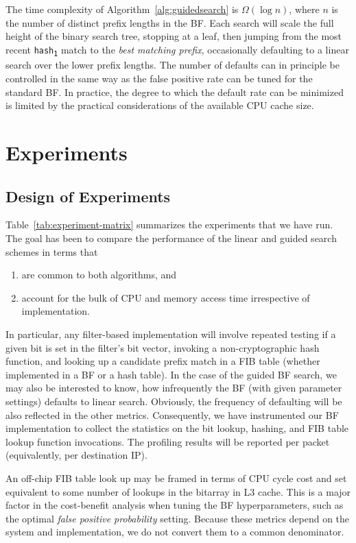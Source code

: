 \documentclass[conference,compsoc]{IEEEtran}
\begin{document}
The time
complexity of Algorithm~\ref{alg:guidedsearch} is $\Omega(\log n)$, 
where $n$ is the number of distinct prefix lengths in the BF. Each
search will scale the full height of the binary search tree, stopping at
a leaf, then jumping from the most recent \texttt{hash\textsubscript{1}} match
to the \emph{best matching prefix}, occasionally defaulting to a linear
search over the lower prefix lengths. The number of defaults can in principle be controlled in the same
way as the false positive rate can be tuned for the standard BF.
In practice, the degree to which the default rate can be minimized is
limited by the practical considerations of the available CPU cache size.

\section{Experiments}

\subsection{Design of Experiments}

Table~\ref{tab:experiment-matrix} summarizes the experiments that we have
run. The goal has been to compare the performance of the linear and guided 
search schemes in terms that

\begin{enumerate}[label=(\alph*)]
\item are common to both algorithms, and
\item account for the bulk of CPU and memory access time irrespective of implementation.
\end{enumerate}

In particular, any filter-based implementation will involve repeated testing
if a given bit is set in the filter's bit vector, invoking a
non-cryptographic hash function, and looking up a candidate prefix match in
a FIB table (whether implemented in a BF or a hash table). In the case
of the guided BF search, we may also be interested to know, how infrequently
the BF (with given parameter settings) defaults to linear search. Obviously,
the frequency of defaulting will be also reflected in the other metrics. 
Consequently, we have instrumented our BF implementation to collect the 
statistics on
the bit lookup, hashing, and FIB table lookup
function invocations. The profiling results will be reported per packet
(equivalently, per destination IP).

An off-chip FIB table look up may be framed in terms of
CPU cycle cost and set equivalent to some number of lookups in the 
bitarray in L3 cache. This is a major factor in the cost-benefit analysis 
when tuning the BF hyperparameters, such as the optimal 
\emph{false positive probability}
setting. Because these metrics depend on the system and implementation, we
do not convert them to a common denominator.
\end{document}
